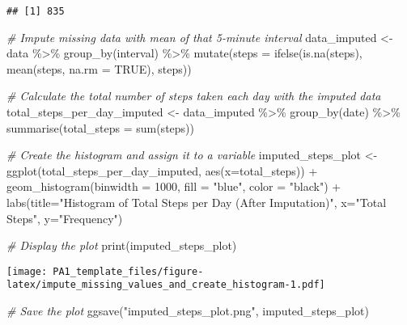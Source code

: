 \documentclass[
]{article}
\newenvironment{Shaded}{\begin{snugshade}}{\end{snugshade}}
\newcommand{\AttributeTok}[1]{\textcolor[rgb]{0.77,0.63,0.00}{#1}}
\newcommand{\CommentTok}[1]{\textcolor[rgb]{0.56,0.35,0.01}{\textit{#1}}}
\newcommand{\ConstantTok}[1]{\textcolor[rgb]{0.00,0.00,0.00}{#1}}
\newcommand{\DecValTok}[1]{\textcolor[rgb]{0.00,0.00,0.81}{#1}}
\newcommand{\FunctionTok}[1]{\textcolor[rgb]{0.00,0.00,0.00}{#1}}
\newcommand{\NormalTok}[1]{#1}
\newcommand{\OtherTok}[1]{\textcolor[rgb]{0.56,0.35,0.01}{#1}}
\newcommand{\SpecialCharTok}[1]{\textcolor[rgb]{0.00,0.00,0.00}{#1}}
\newcommand{\StringTok}[1]{\textcolor[rgb]{0.31,0.60,0.02}{#1}}
\begin{document}
\begin{verbatim}
## [1] 835
\end{verbatim}

\begin{Shaded}
\begin{Highlighting}[]
\CommentTok{\# Impute missing data with mean of that 5{-}minute interval}
\NormalTok{data\_imputed }\OtherTok{\textless{}{-}}\NormalTok{ data }\SpecialCharTok{\%\textgreater{}\%} 
  \FunctionTok{group\_by}\NormalTok{(interval) }\SpecialCharTok{\%\textgreater{}\%} 
  \FunctionTok{mutate}\NormalTok{(}\AttributeTok{steps =} \FunctionTok{ifelse}\NormalTok{(}\FunctionTok{is.na}\NormalTok{(steps), }\FunctionTok{mean}\NormalTok{(steps, }\AttributeTok{na.rm =} \ConstantTok{TRUE}\NormalTok{), steps))}

\CommentTok{\# Calculate the total number of steps taken each day with the imputed data}
\NormalTok{total\_steps\_per\_day\_imputed }\OtherTok{\textless{}{-}}\NormalTok{ data\_imputed }\SpecialCharTok{\%\textgreater{}\%} \FunctionTok{group\_by}\NormalTok{(date) }\SpecialCharTok{\%\textgreater{}\%} \FunctionTok{summarise}\NormalTok{(}\AttributeTok{total\_steps =} \FunctionTok{sum}\NormalTok{(steps))}

\CommentTok{\# Create the histogram and assign it to a variable}
\NormalTok{imputed\_steps\_plot }\OtherTok{\textless{}{-}} \FunctionTok{ggplot}\NormalTok{(total\_steps\_per\_day\_imputed, }\FunctionTok{aes}\NormalTok{(}\AttributeTok{x=}\NormalTok{total\_steps)) }\SpecialCharTok{+}
  \FunctionTok{geom\_histogram}\NormalTok{(}\AttributeTok{binwidth =} \DecValTok{1000}\NormalTok{, }\AttributeTok{fill =} \StringTok{"blue"}\NormalTok{, }\AttributeTok{color =} \StringTok{"black"}\NormalTok{) }\SpecialCharTok{+}
  \FunctionTok{labs}\NormalTok{(}\AttributeTok{title=}\StringTok{"Histogram of Total Steps per Day (After Imputation)"}\NormalTok{, }\AttributeTok{x=}\StringTok{"Total Steps"}\NormalTok{, }\AttributeTok{y=}\StringTok{"Frequency"}\NormalTok{)}

\CommentTok{\# Display the plot}
\FunctionTok{print}\NormalTok{(imputed\_steps\_plot)}
\end{Highlighting}
\end{Shaded}

\texttt{[image: PA1\_template\_files/figure-latex/impute\_missing\_values\_and\_create\_histogram-1.pdf]}

\begin{Shaded}
\begin{Highlighting}[]
\CommentTok{\# Save the plot}
\FunctionTok{ggsave}\NormalTok{(}\StringTok{"imputed\_steps\_plot.png"}\NormalTok{, imputed\_steps\_plot)}
\end{Highlighting}
\end{Shaded}
\end{document}
